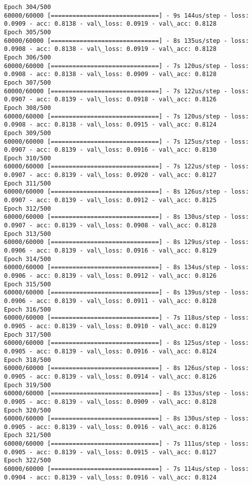 \documentclass[11pt]{article}
\begin{document}
\begin{Verbatim}[commandchars=\\\{\}]
Epoch 304/500
60000/60000 [==============================] - 9s 144us/step - loss: 0.0909 - acc: 0.8138 - val\_loss: 0.0919 - val\_acc: 0.8128
Epoch 305/500
60000/60000 [==============================] - 8s 135us/step - loss: 0.0908 - acc: 0.8138 - val\_loss: 0.0919 - val\_acc: 0.8128
Epoch 306/500
60000/60000 [==============================] - 7s 120us/step - loss: 0.0908 - acc: 0.8138 - val\_loss: 0.0909 - val\_acc: 0.8128
Epoch 307/500
60000/60000 [==============================] - 7s 122us/step - loss: 0.0907 - acc: 0.8139 - val\_loss: 0.0918 - val\_acc: 0.8126
Epoch 308/500
60000/60000 [==============================] - 7s 120us/step - loss: 0.0908 - acc: 0.8138 - val\_loss: 0.0915 - val\_acc: 0.8124
Epoch 309/500
60000/60000 [==============================] - 7s 125us/step - loss: 0.0907 - acc: 0.8139 - val\_loss: 0.0916 - val\_acc: 0.8130
Epoch 310/500
60000/60000 [==============================] - 7s 122us/step - loss: 0.0907 - acc: 0.8139 - val\_loss: 0.0920 - val\_acc: 0.8127
Epoch 311/500
60000/60000 [==============================] - 8s 126us/step - loss: 0.0907 - acc: 0.8139 - val\_loss: 0.0912 - val\_acc: 0.8125
Epoch 312/500
60000/60000 [==============================] - 8s 130us/step - loss: 0.0907 - acc: 0.8139 - val\_loss: 0.0908 - val\_acc: 0.8128
Epoch 313/500
60000/60000 [==============================] - 8s 129us/step - loss: 0.0906 - acc: 0.8139 - val\_loss: 0.0916 - val\_acc: 0.8129
Epoch 314/500
60000/60000 [==============================] - 8s 134us/step - loss: 0.0906 - acc: 0.8139 - val\_loss: 0.0912 - val\_acc: 0.8126
Epoch 315/500
60000/60000 [==============================] - 8s 139us/step - loss: 0.0906 - acc: 0.8139 - val\_loss: 0.0911 - val\_acc: 0.8128
Epoch 316/500
60000/60000 [==============================] - 7s 118us/step - loss: 0.0905 - acc: 0.8139 - val\_loss: 0.0910 - val\_acc: 0.8129
Epoch 317/500
60000/60000 [==============================] - 8s 125us/step - loss: 0.0905 - acc: 0.8139 - val\_loss: 0.0916 - val\_acc: 0.8124
Epoch 318/500
60000/60000 [==============================] - 8s 126us/step - loss: 0.0905 - acc: 0.8139 - val\_loss: 0.0914 - val\_acc: 0.8126
Epoch 319/500
60000/60000 [==============================] - 8s 133us/step - loss: 0.0905 - acc: 0.8139 - val\_loss: 0.0909 - val\_acc: 0.8128
Epoch 320/500
60000/60000 [==============================] - 8s 130us/step - loss: 0.0905 - acc: 0.8139 - val\_loss: 0.0916 - val\_acc: 0.8126
Epoch 321/500
60000/60000 [==============================] - 7s 111us/step - loss: 0.0905 - acc: 0.8139 - val\_loss: 0.0915 - val\_acc: 0.8127
Epoch 322/500
60000/60000 [==============================] - 7s 114us/step - loss: 0.0904 - acc: 0.8139 - val\_loss: 0.0916 - val\_acc: 0.8124

\end{Verbatim}
\end{document}
